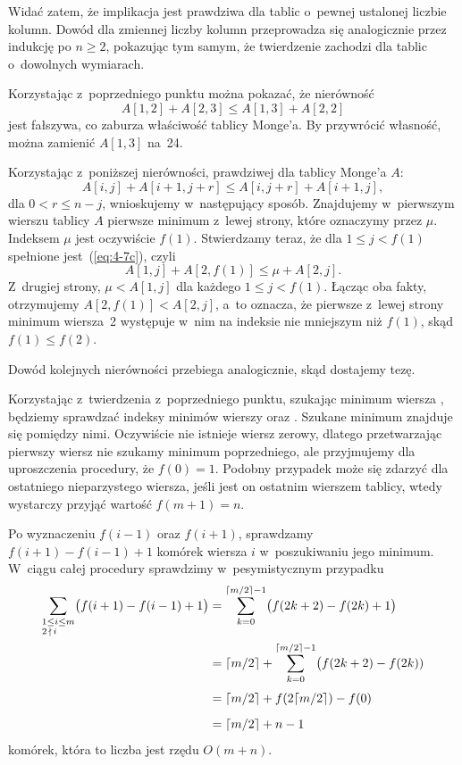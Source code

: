 Widać zatem, że implikacja jest prawdziwa dla tablic o~pewnej ustalonej liczbie kolumn. Dowód dla zmiennej liczby kolumn przeprowadza się analogicznie przez indukcję po $n\ge2$, pokazując tym samym, że twierdzenie zachodzi dla tablic o~dowolnych wymiarach.

\subproblem %
Korzystając z~poprzedniego punktu można pokazać, że nierówność
\[
	A[1,2]+A[2,3] \le A[1,3]+A[2,2]
\]
jest fałszywa, co zaburza właściwość tablicy Monge'a. By przywrócić własność, można zamienić $A[1,3]$ na~24.

\subproblem %
Korzystając z~poniższej nierówności, prawdziwej dla tablicy Monge'a $A$:
\[
	A[i,j]+A[i+1,j+r] \le A[i,j+r]+A[i+1,j], \tag{$*$}\label{eq:4-7c}
\]
dla $0<r\le n-j$, wnioskujemy w~następujący sposób. Znajdujemy w~pierwszym wierszu tablicy $A$ pierwsze minimum z~lewej strony, które oznaczymy przez $\mu$. Indeksem $\mu$ jest oczywiście $f(1)$. Stwierdzamy teraz, że dla $1\le j<f(1)$ spełnione jest~(\ref{eq:4-7c}), czyli
\[
	A[1,j]+A[2,f(1)] \le \mu+A[2,j].
\]
Z~drugiej strony, $\mu<A[1,j]$ dla każdego $1\le j<f(1)$. Łącząc oba fakty, otrzymujemy $A[2,f(1)]<A[2,j]$, a~to oznacza, że pierwsze z~lewej strony minimum wiersza~2 występuje w~nim na indeksie nie mniejszym niż $f(1)$, skąd $f(1)\le f(2)$.

Dowód kolejnych nierówności przebiega analogicznie, skąd dostajemy tezę.

\subproblem %
Korzystając z~twierdzenia z~poprzedniego punktu, szukając minimum wiersza , będziemy sprawdzać indeksy minimów wierszy  oraz . Szukane minimum znajduje się pomiędzy nimi. Oczywiście nie istnieje wiersz zerowy, dlatego przetwarzając pierwszy wiersz nie szukamy minimum poprzedniego, ale przyjmujemy dla uproszczenia procedury, że $f(0)=1$. Podobny przypadek może się zdarzyć dla ostatniego nieparzystego wiersza, jeśli jest on ostatnim wierszem tablicy, wtedy wystarczy przyjąć wartość $f(m+1)=n$.

Po wyznaczeniu $f(i-1)$ oraz $f(i+1)$, sprawdzamy $f(i+1)-f(i-1)+1$ komórek wiersza $i$ w~poszukiwaniu jego minimum. W~ciągu całej procedury sprawdzimy w~pesymistycznym przypadku
\begin{align*}
	\sum_{\begin{subarray}{l}1\le i\le m\\2\,\nmid\,i\end{subarray}}\bigl(f(i+1)-f(i-1)+1\bigr) &= \sum_{k=0}^{\lceil m/2\rceil-1}\bigl(f(2k+2)-f(2k)+1\bigr) \\
	&= \lceil m/2\rceil+\sum_{k=0}^{\lceil m/2\rceil-1}\bigl(f(2k+2)-f(2k)) \\[1mm]
	&= \lceil m/2\rceil+f(2\lceil m/2\rceil)-f(0) \\[2mm]
	&= \lceil m/2\rceil+n-1
\end{align*}
komórek, która to liczba jest rzędu $O(m+n)$.

